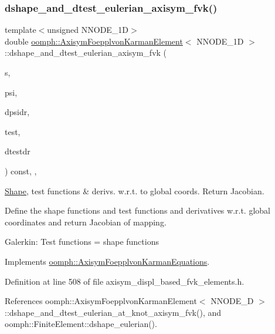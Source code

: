 \subsubsection{\texorpdfstring{dshape\+\_\+and\+\_\+dtest\+\_\+eulerian\+\_\+axisym\+\_\+fvk()}{dshape\_and\_dtest\_eulerian\_axisym\_fvk()}\hspace{0.1cm}{\footnotesize\ttfamily [2/2]}}
{\footnotesize\ttfamily template$<$unsigned N\+N\+O\+D\+E\+\_\+1D$>$ \\
double \hyperlink{classoomph_1_1AxisymFoepplvonKarmanElement}{oomph\+::\+Axisym\+Foepplvon\+Karman\+Element}$<$ N\+N\+O\+D\+E\+\_\+1D $>$\+::dshape\+\_\+and\+\_\+dtest\+\_\+eulerian\+\_\+axisym\+\_\+fvk (\begin{DoxyParamCaption}\item[{const \hyperlink{classoomph_1_1Vector}{Vector}$<$ double $>$ \&}]{s,  }\item[{\hyperlink{classoomph_1_1Shape}{Shape} \&}]{psi,  }\item[{\hyperlink{classoomph_1_1DShape}{D\+Shape} \&}]{dpsidr,  }\item[{\hyperlink{classoomph_1_1Shape}{Shape} \&}]{test,  }\item[{\hyperlink{classoomph_1_1DShape}{D\+Shape} \&}]{dtestdr }\end{DoxyParamCaption}) const\hspace{0.3cm}{\ttfamily [inline]}, {\ttfamily [protected]}, {\ttfamily [virtual]}}



\hyperlink{classoomph_1_1Shape}{Shape}, test functions \& derivs. w.\+r.\+t. to global coords. Return Jacobian. 

Define the shape functions and test functions and derivatives w.\+r.\+t. global coordinates and return Jacobian of mapping.

Galerkin\+: Test functions = shape functions 

Implements \hyperlink{classoomph_1_1AxisymFoepplvonKarmanEquations_a838cd424e2666b007113de0a95f5d999}{oomph\+::\+Axisym\+Foepplvon\+Karman\+Equations}.



Definition at line 508 of file axisym\+\_\+displ\+\_\+based\+\_\+fvk\+\_\+elements.\+h.



References oomph\+::\+Axisym\+Foepplvon\+Karman\+Element$<$ N\+N\+O\+D\+E\+\_\+D $>$\+::dshape\+\_\+and\+\_\+dtest\+\_\+eulerian\+\_\+at\+\_\+knot\+\_\+axisym\+\_\+fvk(), and oomph\+::\+Finite\+Element\+::dshape\+\_\+eulerian().



